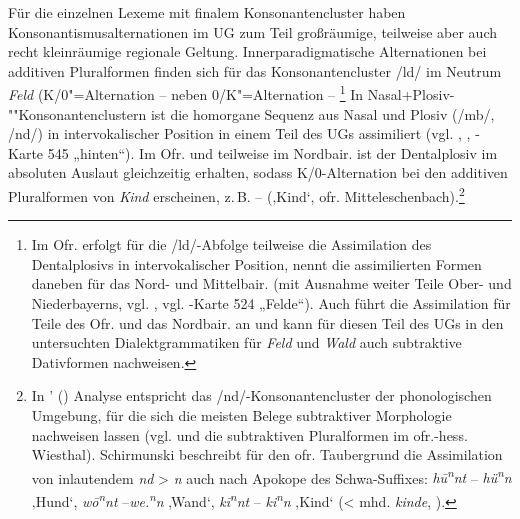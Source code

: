 Für die einzelnen Lexeme mit finalem Konsonantencluster haben Konsonantismusalternationen im UG zum Teil großräumige, teilweise aber auch recht kleinräumige regionale Geltung. Innerparadigmatische Alternationen bei additiven Pluralformen finden sich für das Konsonantencluster /ld/ im Neutrum \textit{Feld} (K/0"=Alternation  --  neben 0/K"=Alternation  -- \footnote{Im Ofr. erfolgt für die /ld/-Abfolge teilweise die Assimilation des Dentalplosivs in intervokalischer Position, \citet[§28c]{Kranzmayer1956} nennt die assimilierten Formen daneben für das Nord- und Mittelbair. (mit Ausnahme weiter Teile Ober- und Niederbayerns, vgl. \citealt[400]{Schirmunski1962}, vgl. \citealt{WA}-Karte 524 „Felde“). Auch \citet[69f.]{Birkenes2014} führt die Assimilation für Teile des Ofr. und das Nordbair. an und kann für diesen Teil des UGs in den untersuchten Dialektgrammatiken für \textit{Feld} und \textit{Wald} auch subtraktive Dativformen nachweisen.} In Na\-sal+Plo\-siv-""Kon\-so\-nan\-ten\-clus\-tern ist die homorgane Sequenz aus Nasal und Plosiv (/mb/, /nd/) in intervokalischer Position in einem Teil des UGs assimiliert (vgl. \citealt[392--395]{Schirmunski1962}, \citealt[§28c2]{Kranzmayer1956}, \citealt{WA}-Karte 545 „hinten“). Im Ofr. und teilweise im Nordbair. ist der Dentalplosiv im absoluten Auslaut gleichzeitig erhalten, sodass K/0-Alternation bei den additiven Pluralformen von \textit{Kind} erscheinen, z.\,B.    --   (‚Kind‘, ofr. Mitteleschenbach).\footnote{In \citeauthor{Birkenes2014}' (\citeyear[56]{Birkenes2014}) Analyse entspricht das /nd/-Konsonantencluster der phonologischen Umgebung, für die sich die meisten Belege subtraktiver Morphologie nachweisen lassen (vgl.  und die subtraktiven Pluralformen im ofr.-hess. Wiesthal). Schirmunski beschreibt für den ofr. Taubergrund die Assimilation von inlautendem \textit{nd} > \textit{n} auch nach Apokope des Schwa-Suffixes: \textit{hū\textsuperscript{n}}\textit{nt} -- \textit{hü\textsuperscript{n}}\textit{n} ‚Hund‘, \textit{wō\textsuperscript{n}}\textit{nt} --\textit{w}\textrm{\textit{e.}}\textit{\textsuperscript{n}}\textit{n} ‚Wand‘, \textit{kī\textsuperscript{n}}\textit{nt} -- \textit{ki\textsuperscript{n}}\textit{n} ‚Kind‘ (< mhd. \textit{kinde}, \citealt[394]{Schirmunski1962}).}




